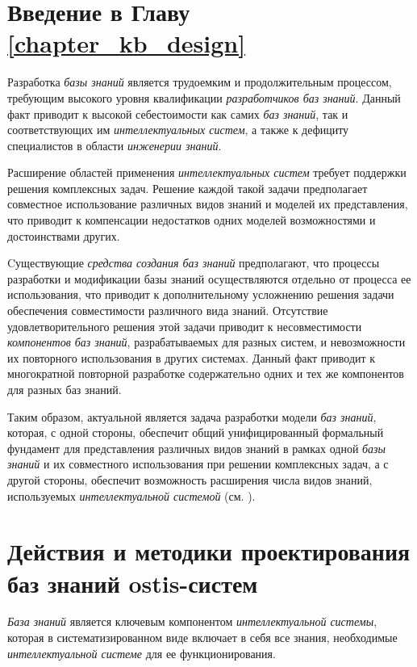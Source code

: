 \section*{Введение в Главу \ref{chapter_kb_design}}

Разработка \textit{базы знаний} является трудоемким и продолжительным процессом, требующим высокого уровня квалификации \textit{разработчиков баз знаний}. Данный факт приводит к высокой себестоимости как самих \textit{баз знаний}, так и соответствующих им \textit{интеллектуальных систем}, а также к дефициту специалистов в области \textit{инженерии знаний}.

Расширение областей применения \textit{интеллектуальных систем} требует поддержки решения комплексных задач.
Решение каждой такой задачи предполагает совместное использование различных видов знаний и моделей их представления, что приводит к компенсации недостатков одних моделей возможностями и достоинствами других.

Cуществующие \textit{средства создания баз знаний} предполагают, что процессы разработки и модификации базы знаний осуществляются отдельно от процесса ее использования, что приводит к дополнительному усложнению решения задачи обеспечения совместимости различного вида знаний.
Отсутствие удовлетворительного решения этой задачи приводит к несовместимости \textit{компонентов баз знаний}, разрабатываемых для разных систем, и невозможности их повторного использования в других системах.
Данный факт приводит к многократной повторной разработке содержательно одних и тех же компонентов для разных баз знаний.

Таким образом, актуальной является задача разработки модели \textit{баз знаний}, которая, с одной стороны, обеспечит общий унифицированный формальный фундамент для представления различных видов знаний в рамках одной \textit{базы знаний} и их совместного использования при решении комплексных задач, а с другой стороны, обеспечит возможность расширения числа видов знаний, используемых \textit{интеллектуальной системой} (см. ).


\section{Действия и методики проектирования баз знаний ostis-систем}
\label{sec_kb_design_methods}

\textit{База знаний} является ключевым компонентом \textit{интеллектуальной системы}, которая в систематизированном виде включает в себя все знания, необходимые \textit{интеллектуальной системе} для ее функционирования.

